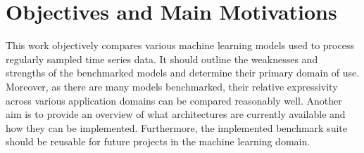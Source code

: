 \documentclass[draft,final]{vutinfth} %
\begin{document}
    \section{Objectives and Main Motivations}
    This work objectively compares various machine learning models used to process regularly sampled time series data.
    It should outline the weaknesses and strengths of the benchmarked models and determine their primary domain of use.
    Moreover, as there are many models benchmarked, their relative expressivity across various application domains can be compared reasonably well.
    Another aim is to provide an overview of what architectures are currently available and how they can be implemented.
    Furthermore, the implemented benchmark suite should be reusable for future projects in the machine learning domain.
\end{document}
